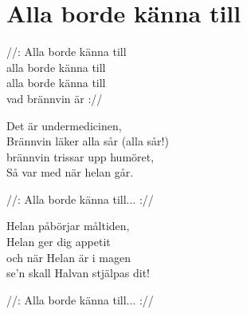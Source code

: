 \section{Alla borde känna till}

//: Alla borde känna till\\
alla borde känna till\\
alla borde känna till\\
vad brännvin är ://

Det är undermedicinen,\\
Brännvin läker alla sår (alla sår!)\\
brännvin trissar upp humöret,\\
Så var med när helan går.

//: Alla borde känna till... ://

Helan påbörjar måltiden,\\
Helan ger dig appetit\\
och när Helan är i magen\\
se’n skall Halvan stjälpas dit!

//: Alla borde känna till... ://